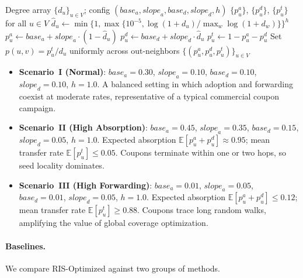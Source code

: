 \documentclass[sigconf]{acmart}
\begin{document}
\begin{algorithm}[t]
\caption{Generate Degree-Based Node Probability Distributions}
\label{alg:gendist}
\begin{algorithmic}[1]
\Require Degree array $\{d_u\}_{u\in V}$; config $(\textit{base}_a, \textit{slope}_a, \textit{base}_d, \textit{slope}_d, h)$
\Ensure $\{p_u^a\}$, $\{p_u^d\}$, $\{p_u^t\}$ for all $u\in V$
  \State $\hat{d}_u \leftarrow \min\!\bigl\{1,\max\{10^{-5}, \log(1+d_u)/\max_w\log(1+d_w)\}\bigr\}^h$
\EndFor
{}
  \State $p_u^a \leftarrow \textit{base}_a + \textit{slope}_a \cdot (1 - \hat{d}_u)$
  \State $p_u^d \leftarrow \textit{base}_d + \textit{slope}_d \cdot \hat{d}_u$
  \State $p_u^t \leftarrow 1 - p_u^a - p_u^d$
\EndFor
\State Set $p(u,v) = p_u^t / d_u$ uniformly across out-neighbors
\State \Return $\{(p_u^a, p_u^d, p_u^t)\}_{u\in V}$
\end{algorithmic}
\end{algorithm}

\begin{itemize}
  \item \textbf{Scenario~I (Normal)}: $\textit{base}_a=0.30$, $\textit{slope}_a=0.10$, $\textit{base}_d=0.10$, $\textit{slope}_d=0.10$, $h=1.0$. A balanced setting in which adoption and forwarding coexist at moderate rates, representative of a typical commercial coupon campaign.

  \item \textbf{Scenario~II (High Absorption)}: $\textit{base}_a=0.45$, $\textit{slope}_a=0.35$, $\textit{base}_d=0.15$, $\textit{slope}_d=0.05$, $h=1.0$. Expected absorption $\mathbb{E}[p_u^a + p_u^d] \approx 0.95$; mean transfer rate $\mathbb{E}[p_u^t] \leq 0.05$. Coupons terminate within one or two hops, so seed locality dominates.

  \item \textbf{Scenario~III (High Forwarding)}: $\textit{base}_a=0.01$, $\textit{slope}_a=0.05$, $\textit{base}_d=0.01$, $\textit{slope}_d=0.05$, $h=1.0$. Expected absorption $\mathbb{E}[p_u^a + p_u^d] \leq 0.12$; mean transfer rate $\mathbb{E}[p_u^t] \geq 0.88$. Coupons trace long random walks, amplifying the value of global coverage optimization.
\end{itemize}

\paragraph{Baselines.}
We compare RIS-Optimized against two groups of methods.
\end{document}
